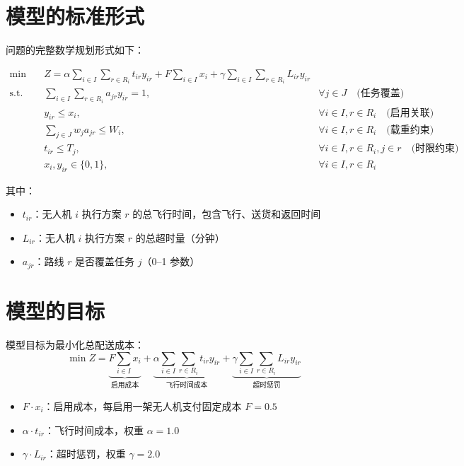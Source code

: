 \documentclass[12pt,a4paper]{article}
\begin{document}
\section{模型的标准形式}

问题的完整数学规划形式如下：

\[
\boxed{
\begin{aligned}
\min \quad & Z = \alpha \sum_{i \in I} \sum_{r \in R_i} t_{ir} y_{ir} + F \sum_{i \in I} x_i + \gamma \sum_{i \in I} \sum_{r \in R_i} L_{ir} y_{ir} \\[8pt]
\text{s.t.} \quad
& \sum_{i \in I} \sum_{r \in R_i} a_{jr} y_{ir} = 1, & \forall j \in J \quad \text{(任务覆盖)} \\[4pt]
& y_{ir} \leq x_i, & \forall i \in I, r \in R_i \quad \text{(启用关联)} \\[4pt]
& \sum_{j \in J} w_j a_{jr} \leq W_i, & \forall i \in I, r \in R_i \quad \text{(载重约束)} \\[4pt]
& t_{ir} \leq T_j, & \forall i \in I, r \in R_i, j \in r \quad \text{(时限约束)} \\[4pt]
& x_i, y_{ir} \in \{0, 1\}, & \forall i \in I, r \in R_i
\end{aligned}
}
\]

其中：
\begin{itemize}[leftmargin=2em]
  \item $t_{ir}$：无人机 $i$ 执行方案 $r$ 的总飞行时间，包含飞行、送货和返回时间
  \item $L_{ir}$：无人机 $i$ 执行方案 $r$ 的总超时量（分钟）
  \item $a_{jr}$：路线 $r$ 是否覆盖任务 $j$（0--1 参数）
\end{itemize}

\section{模型的目标}

模型目标为最小化总配送成本：
\[
\min Z = \underbrace{F \sum_{i \in I} x_i}_{\text{启用成本}} + \underbrace{\alpha \sum_{i \in I} \sum_{r \in R_i} t_{ir} y_{ir}}_{\text{飞行时间成本}} + \underbrace{\gamma \sum_{i \in I} \sum_{r \in R_i} L_{ir} y_{ir}}_{\text{超时惩罚}}
\]

\begin{itemize}[leftmargin=2em]
  \item $F \cdot x_i$：启用成本，每启用一架无人机支付固定成本 $F = 0.5$
  \item $\alpha \cdot t_{ir}$：飞行时间成本，权重 $\alpha = 1.0$
  \item $\gamma \cdot L_{ir}$：超时惩罚，权重 $\gamma = 2.0$
\end{itemize}
\end{document}
